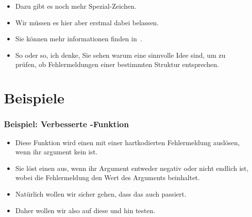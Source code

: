 \documentclass[aspectratio=169,mathserif,notheorems]{beamer}%
\begin{document}
\begin{frame}
\begin{itemize}
%
\item<16-> Dazu gibt es noch mehr Spezial-Zeichen.%
%
\item<17-> Wir müssen es hier aber erstmal dabei belassen.%
%
\item<18-> Sie können mehr informationen finden in~.%
%
\item<19-> So oder so, ich denke, Sie sehen warum  eine sinnvolle Idee sind, um zu prüfen, ob Fehlermeldungen einer bestimmten Struktur entsprechen.%
\end{itemize}%
\end{frame}%
%
\section{Beispiele}%
%
\begin{frame}[t]%
\frametitle{Beispiel: Verbesserte -Funktion}%
\parbox{0.4\paperwidth}{\small{%
\begin{itemize}%
%
%
%
%
%
%
%
\item<4-> Diese Funktion wird einen  mit einer hartkodierten Fehlermeldung auslösen, wenn ihr argument kein  ist.%
%
\item<5-> Sie löst einen  aus, wenn ihr Argument entweder negativ oder nicht endlich ist, wobei die Fehlermeldung den Wert des Arguments beinhaltet.%
%
\item<6-> Natürlich wollen wir sicher gehen, dass das auch passiert.%
%
\item<7-> Daher wollen wir also auf diese  und  hin testen.%
%
\end{itemize}%
}}%
%
%
%
%
%
\end{frame}%
\end{document}

